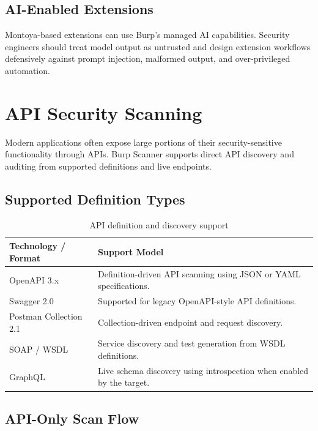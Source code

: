 \documentclass[11pt]{article}
\begin{document}
\subsection{AI-Enabled Extensions}

Montoya-based extensions can use Burp's managed AI capabilities. Security engineers should treat model output as untrusted and design extension workflows defensively against prompt injection, malformed output, and over-privileged automation.

\section{API Security Scanning}

Modern applications often expose large portions of their security-sensitive functionality through APIs. Burp Scanner supports direct API discovery and auditing from supported definitions and live endpoints.

\subsection{Supported Definition Types}

\begin{table}[htbp]
\centering
\caption{API definition and discovery support}
\begin{tabularx}{\textwidth}{@{}lX@{}}
\toprule
\textbf{Technology / Format} & \textbf{Support Model} \\
\midrule
OpenAPI 3.x & Definition-driven API scanning using JSON or YAML specifications. \\
Swagger 2.0 & Supported for legacy OpenAPI-style API definitions. \\
Postman Collection 2.1 & Collection-driven endpoint and request discovery. \\
SOAP / WSDL & Service discovery and test generation from WSDL definitions. \\
GraphQL & Live schema discovery using introspection when enabled by the target. \\
\bottomrule
\end{tabularx}
\end{table}

\subsection{API-Only Scan Flow}
\end{document}
